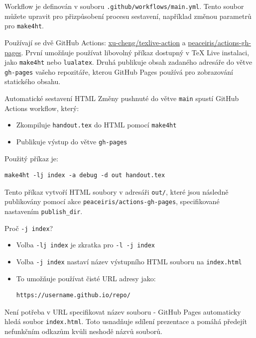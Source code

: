 Workflow je definován v souboru \texttt{.github/workflows/main.yml}.
Tento soubor můžete upravit pro přizpůsobení procesu sestavení, například změnou parametrů pro \texttt{make4ht}.

Používají se dvě GitHub Actions: \href{https://github.com/xu-cheng/texlive-action}{xu-cheng/texlive-action}
a \href{https://github.com/peaceiris/actions-gh-pages}{peaceiris/actions-gh-pages}.
První umožňuje používat libovolný příkaz dostupný v TeX Live instalaci, jako \texttt{make4ht} nebo \texttt{lualatex}.
Druhá publikuje obsah zadaného adresáře do větve \texttt{gh-pages} vašeho repozitáře,
kterou GitHub Pages používá pro zobrazování statického obsahu.

\begin{frame}[fragile]{Automatické sestavení HTML}
Změny pushnuté do větve \texttt{main} spustí GitHub Actions workflow, který:

\begin{itemize}
\item Zkompiluje \texttt{handout.tex} do HTML pomocí \texttt{make4ht}
\item Publikuje výstup do větve \texttt{gh-pages}
\end{itemize}

Použitý příkaz je:

\begin{verbatim}
make4ht -lj index -a debug -d out handout.tex
\end{verbatim}
\end{frame}

Tento příkaz vytvoří HTML soubory v adresáři \texttt{out/}, které jsou následně publikovány
pomocí akce \texttt{peaceiris/actions-gh-pages}, specifikované nastavením
\texttt{publish_dir}.

\begin{frame}[fragile]{Proč \texttt{-j index}?}
\begin{itemize}
\item Volba \texttt{-lj index} je zkratka pro \texttt{-l -j index}
\item Volba \texttt{-j index} nastaví název výstupního HTML souboru na \texttt{index.html}
\item To umožňuje používat čisté URL adresy jako:

\begin{verbatim}
https://username.github.io/repo/
\end{verbatim}

\end{itemize}
\end{frame}

Není potřeba v URL specifikovat název souboru - GitHub Pages
automaticky hledá soubor \texttt{index.html}. Toto usnadňuje sdílení
prezentace a pomáhá předejít nefunkčním odkazům kvůli neshodě názvů souborů.


